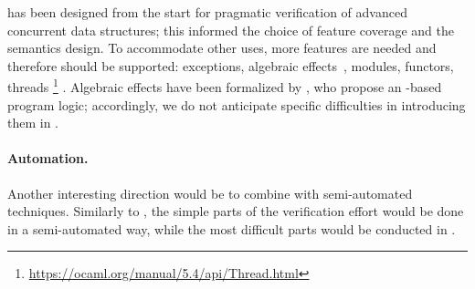 \ZooLang has been designed from the start for pragmatic verification of advanced concurrent data structures; this informed the choice of feature coverage and the semantics design.
To accommodate other uses, more features are needed and therefore should be supported: exceptions, algebraic effects~\citep*{DBLP:conf/pldi/Sivaramakrishnan21}, modules, functors, threads%
\footnote{
\url{https://ocaml.org/manual/5.4/api/Thread.html}
}%
.
Algebraic effects have been formalized by \citet*{DBLP:journals/pacmpl/VilhenaP21}, who propose an \Iris-based program logic; accordingly, we do not anticipate specific difficulties in introducing them in \ZooLang.

\paragraph{Automation.}

Another interesting direction would be to combine \Zoo with semi-automated techniques.
Similarly to \WhyThree, the simple parts of the verification effort would be done in a semi-automated way, while the most difficult parts would be conducted in \Rocq.


